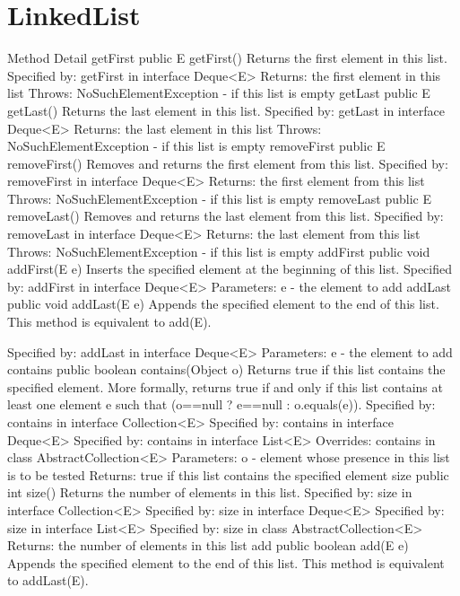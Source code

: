 \documentclass{book}
\begin{document}
\section{LinkedList}
Method Detail
getFirst
public E getFirst()
Returns the first element in this list.
Specified by:
getFirst in interface Deque<E>
Returns:
the first element in this list
Throws:
NoSuchElementException - if this list is empty
getLast
public E getLast()
Returns the last element in this list.
Specified by:
getLast in interface Deque<E>
Returns:
the last element in this list
Throws:
NoSuchElementException - if this list is empty
removeFirst
public E removeFirst()
Removes and returns the first element from this list.
Specified by:
removeFirst in interface Deque<E>
Returns:
the first element from this list
Throws:
NoSuchElementException - if this list is empty
removeLast
public E removeLast()
Removes and returns the last element from this list.
Specified by:
removeLast in interface Deque<E>
Returns:
the last element from this list
Throws:
NoSuchElementException - if this list is empty
addFirst
public void addFirst(E e)
Inserts the specified element at the beginning of this list.
Specified by:
addFirst in interface Deque<E>
Parameters:
e - the element to add
addLast
public void addLast(E e)
Appends the specified element to the end of this list.
This method is equivalent to add(E).

Specified by:
addLast in interface Deque<E>
Parameters:
e - the element to add
contains
public boolean contains(Object o)
Returns true if this list contains the specified element. More formally, returns true if and only if this list contains at least one element e such that (o==null ? e==null : o.equals(e)).
Specified by:
contains in interface Collection<E>
Specified by:
contains in interface Deque<E>
Specified by:
contains in interface List<E>
Overrides:
contains in class AbstractCollection<E>
Parameters:
o - element whose presence in this list is to be tested
Returns:
true if this list contains the specified element
size
public int size()
Returns the number of elements in this list.
Specified by:
size in interface Collection<E>
Specified by:
size in interface Deque<E>
Specified by:
size in interface List<E>
Specified by:
size in class AbstractCollection<E>
Returns:
the number of elements in this list
add
public boolean add(E e)
Appends the specified element to the end of this list.
This method is equivalent to addLast(E).
\end{document}
